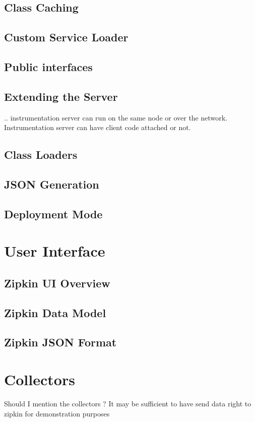 \subsection{Class Caching}
\subsection{Custom Service Loader}
\subsection{Public interfaces}
\subsection{Extending the Server}
.. instrumentation server can run on the same node or over the network. Instrumentation server can have client code attached or not.
\subsection{Class Loaders}
\subsection{JSON Generation}
\subsection{Deployment Mode}
\label{sec:deploy_mode}
\section{User Interface}
\label{sec:zipkin_ui}
\subsection{Zipkin UI Overview}
\subsection{Zipkin Data Model}
\subsection{Zipkin JSON Format}
\section{Collectors}
Should I mention the collectors ? It may be sufficient to have send data right to zipkin for demonstration purposes
